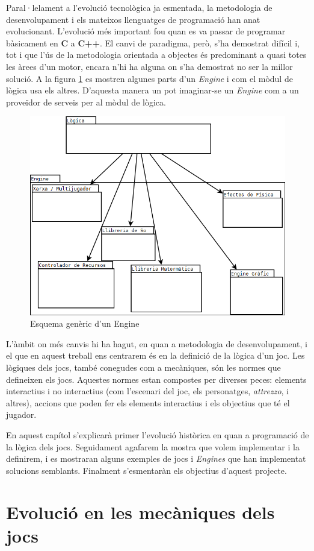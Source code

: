 Paral·lelament a l'evolució tecnològica ja esmentada, la metodologia de desenvolupament i els mateixos llenguatges de programació han anat evolucionant. L'evolució més important fou quan es va passar de programar bàsicament en {\bf C} a {\bf C++}. El canvi de paradigma, però, s'ha demostrat difícil i, tot i que l'ús de la metodologia orientada a objectes és predominant a quasi totes les àrees d'un motor, encara n'hi ha alguna on s'ha demostrat no ser la millor solució. A la figura \ref{fig:EsquemaEngine} es mostren algunes parts d'un {\em Engine} i com el mòdul de lògica usa els altres. D'aquesta manera un pot imaginar-se un {\em Engine} com a un proveïdor de serveis per al mòdul de lògica.


\begin{figure}
  \centering
  \includegraphics[width=0.58\linewidth]{./img/EsquemaEngine.png}
  \caption{Esquema genèric d'un Engine \label{fig:EsquemaEngine}}
\end{figure}

L'àmbit on més canvis hi ha hagut, en quan a metodologia de desenvolupament, i el que en aquest treball ens centrarem és en la definició de la lògica d'un joc. Les lògiques dels jocs, també conegudes com a mecàniques, són les normes que defineixen els jocs. Aquestes normes estan compostes per diverses peces: elements interactius i no interactius (com l'escenari del joc, els personatges, {\em attrezzo}, i altres), accions que poden fer els elements interactius i els objectius que té el jugador.

En aquest capítol s'explicarà primer l'evolució històrica en quan a programació de la lògica dels jocs. Seguidament agafarem la mostra que volem implementar i la definirem, i es mostraran alguns exemples de jocs i {\em Engines} que han implementat solucions semblants. Finalment s'esmentaràn els objectius d'aquest projecte.

\section{Evolució en les mecàniques dels jocs}

